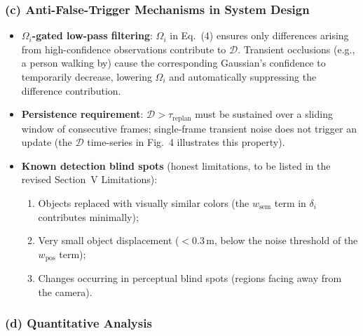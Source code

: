\documentclass[10pt,a4paper]{article}
\begin{document}
\subsubsection*{(c) Anti-False-Trigger Mechanisms in System Design}

\begin{itemize}[leftmargin=1.8em,topsep=2pt,itemsep=2pt]
  \item \textbf{$\Omega_i$-gated low-pass filtering}: $\Omega_i$ in Eq.~(4) ensures only differences arising from high-confidence observations contribute to $\mathcal{D}$. Transient occlusions (e.g., a person walking by) cause the corresponding Gaussian's confidence to temporarily decrease, lowering $\Omega_i$ and automatically suppressing the difference contribution.
  \item \textbf{Persistence requirement}: $\mathcal{D}>\tau_{\text{replan}}$ must be sustained over a sliding window of consecutive frames; single-frame transient noise does not trigger an update (the $\mathcal{D}$ time-series in Fig.~4 illustrates this property).
  \item \textbf{Known detection blind spots} (honest limitations, to be listed in the revised Section~V Limitations):
    \begin{enumerate}[leftmargin=1.2em,topsep=1pt,itemsep=0pt]
      \item Objects replaced with visually similar colors (the $w_{\text{sem}}$ term in $\delta_i$ contributes minimally);
      \item Very small object displacement ($<$0.3\,m, below the noise threshold of the $w_{\text{pos}}$ term);
      \item Changes occurring in perceptual blind spots (regions facing away from the camera).
    \end{enumerate}
\end{itemize}

\subsubsection*{(d) Quantitative Analysis}
\end{document}
